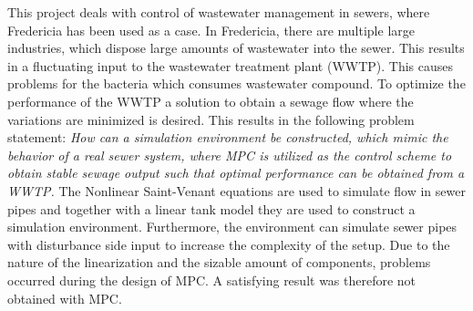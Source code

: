 This project deals with control of wastewater management in sewers, where Fredericia has been used as a case. In Fredericia, there are multiple large industries, which dispose large amounts of wastewater into the sewer. This results in a fluctuating input to the wastewater treatment plant (WWTP). This causes problems for the bacteria which consumes wastewater compound. 
To optimize the performance of the WWTP a solution to obtain a sewage flow where the variations are minimized is desired. 
This results in the following problem statement: \textit{How can a simulation environment be constructed, which mimic the behavior of a real sewer system, where MPC is utilized as the control scheme to obtain stable sewage output such that optimal performance can be obtained from a WWTP.} The Nonlinear Saint-Venant equations are used to simulate flow in sewer pipes and together with a linear tank model they are used to construct a simulation environment. Furthermore, the environment can simulate sewer pipes with disturbance side input to increase the complexity of the setup. Due to the nature of the linearization and the sizable amount of components, problems occurred during the design of MPC. A satisfying result was therefore not obtained with MPC.










